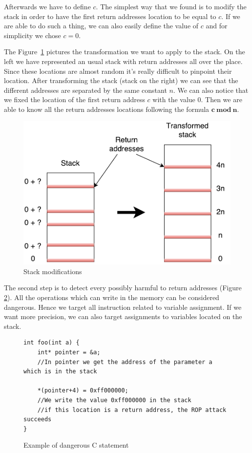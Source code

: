\documentclass[11pt]{sdm}
\begin{document}
Afterwards we have to define $c$. The simplest way that we found is to modify the stack in order to have the first return addresses location to be equal to $c$. If we are able to do such a thing, we can also easily define the value of $c$ and for simplicity we chose $c=0$.

The Figure~\ref{stack_transform} pictures the transformation we want to apply to the stack. On the left we have represented an usual stack with return addresses all over the place. Since these locations are almost random it's really difficult to pinpoint their location. After transforming the stack (stack on the right) we can see that the different addresses are separated by the same constant $n$. We can also notice that we fixed the location of the first return address $c$ with the value 0.
Then we are able to know all the return addresses locations following the formula $\mathbf{c~mod~n}$.

\begin{figure}
\centering
\includegraphics[scale=0.5]{images/stack_transform.pdf}
\caption{Stack modifications}
\label{stack_transform}
\end{figure}

The second step is to detect every possibly harmful to return addresses (Figure \ref{dangerous_statement}). All the operations which can write in the memory can be considered dangerous. Hence we target all instruction related to variable assignment. If we want more precision, we can also target assignments to variables located on the stack.

\begin{figure}
\begin{lstlisting}
int foo(int a) {
	int* pointer = &a;
	//In pointer we get the address of the parameter a which is in the stack

	*(pointer+4) = 0xff000000;
	//We write the value 0xff000000 in the stack
	//if this location is a return address, the ROP attack succeeds
}
\end{lstlisting}
\centering
\caption{Example of dangerous C statement}
\label{dangerous_statement}
\end{figure}
\end{document}
